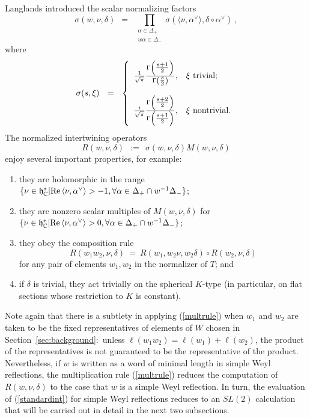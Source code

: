 \documentclass[12pt]{article}
\newcommand{\secref}[1]{Section~\ref{#1}}
\numberwithin{equation}{section}
\renewcommand\d{\delta}
\newcommand\smallf[2]{{\textstyle{\frac{#1}{#2}}}}
\newcommand{\C}{{\mathbb{C}}}
\renewcommand\Re{\text{Re~}}
\renewcommand\({\left(}
\renewcommand\){\right)}
\newcommand\srel[2]{\begin{smallmatrix} {#1} \\ {#2} \end{smallmatrix}}
\begin{document}
Langlands introduced the scalar normalizing factors
\begin{equation}\label{normalizingfactors}
  \sigma(w,\nu,\delta) \ \ = \ \ \prod_{\srel{\alpha\in\Delta_+}{w\alpha\in\Delta_{-}}} \sigma(\langle \nu,\alpha^\vee\rangle,\delta\circ \alpha^\vee)\,,
\end{equation}
where
\begin{equation}\label{cfunction}
  \sigma(s,\xi) \ \ = \ \ \left\{
                        \begin{array}{ll}
                         \frac{1}{\sqrt{\pi}} \frac{\Gamma\(\smallf{s+1}{2}\)}{\Gamma\(\smallf{s}{2}\)}, & \xi\hbox{ trivial;} \\
\\
                         \frac{i}{\sqrt{\pi}} \frac{\Gamma\(\smallf{s+2}{2}\)}{\Gamma\(\smallf{s+1}{2}\)}, & \xi\hbox{ nontrivial.}
                        \end{array}
\right.
\end{equation}
The normalized intertwining operators
\begin{equation}\label{normalizedintertwiners}
  R(w,\nu,\delta) \ \ := \ \ \sigma(w,\nu,\delta) M(w,\nu,\delta)
\end{equation}
enjoy several important properties, for example:
\begin{enumerate}
  \item they are holomorphic in the range $\{\nu\in \frak h_\C^* | \Re\! \langle \nu, \alpha^\vee\rangle > -1,\forall \alpha\in\Delta_+\cap w^{-1}\Delta_{-}\}$;
  \item they are nonzero  scalar multiples of $M(w,\nu,\d)$ for $\{\nu\in \frak h_\C^* | \Re\! \langle \nu, \alpha^\vee\rangle > 0,\forall \alpha\in\Delta_+\cap w^{-1}\Delta_{-}\}$;
  \item they obey the composition rule
\begin{equation}\label{multrule}
  R(w_1w_2,\nu,\delta) \  =  \ R(w_1,w_2\nu,w_2\delta)\circ R(w_2,\nu,\delta)
\end{equation}
for any pair of  elements $w_1,w_2$ in the normalizer of $T$; and
  \item if $\delta$ is trivial, they act trivially on the spherical $K$-type (in particular, on flat sections whose restriction to $K$ is constant).
\end{enumerate}
Note again that there is a subtlety in applying (\ref{multrule}) when $w_1$ and $w_2$ are taken to be the fixed representatives of elements of $W$ chosen in \secref{sec:background}:~unless $\ell(w_1w_2)=\ell(w_1)+\ell(w_2)$, the product of the representatives is not guaranteed to be the representative of the product.
Nevertheless, if $w$ is written as a word of minimal length in simple Weyl reflections, the multiplication rule (\ref{multrule}) reduces the computation of $R(w,\nu,\d)$ to the case that $w$ is a simple Weyl reflection.  In turn, the evaluation of (\ref{standardint}) for simple Weyl reflections reduces to an $SL(2)$ calculation that will be carried out in  detail in the next two subsections.
\end{document}

